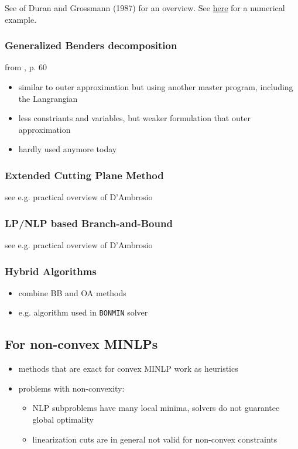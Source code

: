 \documentclass{article}
\begin{document}
\noindent
See \cite{duran1986outer} of Duran and Grossmann (1987) for an overview. See \href{https://optimization.mccormick.northwestern.edu/index.php/Outer-approximation_(OA)}{here} for a numerical example.

\subsubsection{Generalized Benders decomposition}
from \cite{sager2005numerical}, p. 60
\begin{itemize}
\item similar to outer approximation but using another master program, including the Langrangian
\item less constriants and variables, but weaker formulation that outer approximation
\item hardly used anymore today
\end{itemize}

\subsubsection{Extended Cutting Plane Method}
see e.g. practical overview of D'Ambrosio \cite{d2013mixed}
\subsubsection{LP/NLP based Branch-and-Bound}
see e.g. practical overview of D'Ambrosio \cite{d2013mixed}
\subsubsection{Hybrid Algorithms}
\begin{itemize}
\item combine BB and OA methods
\item e.g. algorithm used in \texttt{BONMIN} solver
\end{itemize}
\subsection{For non-convex MINLPs}
\begin{itemize}
\item methods that are exact for convex MINLP work as heuristics
\item problems with non-convexity: 
	\begin{itemize}
	\item NLP subproblems have many local minima, solvers do not guarantee global optimality
	\item linearization cuts are in general not valid for non-convex constraints
	\end{itemize}
\end{itemize}
\end{document}

